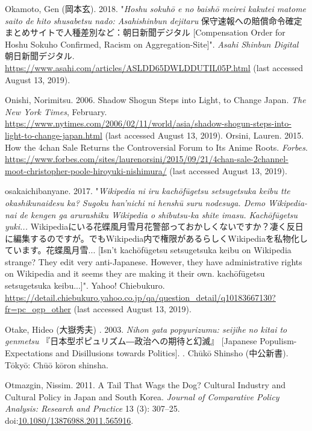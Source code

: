 \documentclass[10pt,british,A4paper,oneside]{memoir}
\begin{document}
\hypertarget{ref-okamoto_eng:_2018}{}
Okamoto, Gen (岡本玄). 2018. "\emph{Hoshu sokuhō e no baishō meirei kakutei matome saito de hito shusabetsu nado: Asahishinbun dejitaru} 保守速報への賠償命令確定 まとめサイトで人種差別など：朝日新聞デジタル [Compensation Order for Hoshu Sokuho Confirmed, Racism on Aggregation-Site]". \emph{Asahi Shinbun Digital} 朝日新聞デジタル.
\url{https://www.asahi.com/articles/ASLDD65DWLDDUTIL05P.html} (last accessed August 13, 2019).

\hypertarget{ref-onishi_shadow_2006}{}
Onishi, Norimitsu. 2006. Shadow Shogun Steps into Light, to Change
Japan. \emph{The New York Times}, February.
\url{https://www.nytimes.com/2006/02/11/world/asia/shadow-shogun-steps-into-light-to-change-japan.html} (last accessed August 13, 2019).
\hypertarget{ref-orsini_how_2015}{}
Orsini, Lauren. 2015. How the 4chan Sale Returns the Controversial Forum
to Its Anime Roots. \emph{Forbes}.
\url{https://www.forbes.com/sites/laurenorsini/2015/09/21/4chan-sale-2channel-moot-christopher-poole-hiroyuki-nishimura/} (last accessed August 13, 2019).

\hypertarget{ref-osakaichibanyane_isnt_2017}{}
osakaichibanyane. 2017. "\emph{Wikipedia ni iru kachōfūgetsu setsugetsuka keibu tte okashikunaidesu ka? Sugoku han'nichi ni henshū suru nodesuga. Demo Wikipedia-nai de kengen ga arurashiku Wikipedia o shibutsu-ka shite imasu. Kachōfūgetsu yuki...} Wikipediaにいる花蝶風月雪月花警部っておかしくないですか？凄く反日に編集するのですが。でもWikipedia内で権限があるらしくWikipediaを私物化しています。花蝶風月雪... [Isn't kachōfūgetsu setsugetsuka keibu on Wikipedia strange? They edit very anti-Japanese. However, they have administrative rights on Wikipedia and it seems they are making it their own. kachōfūgetsu setsugetsuka keibu...]". Yahoo! Chiebukuro. \url{https://detail.chiebukuro.yahoo.co.jp/qa/question_detail/q10183667130?fr=pc_ogp_other} (last accessed August 13, 2019).

\hypertarget{ref-otake__2003}{}
Otake, Hideo (大嶽秀夫) . 2003. \emph{Nihon gata popyurizumu: seijihe no kitai to genmetsu} 『日本型ポピュリズム―政治への期待と幻滅』 [Japanese Populism-Expectations and Disillusions towards Politics].
. Chūkō Shinsho (中公新書). Tōkyō: Chūō kōron shinsha.

\hypertarget{ref-otmazgin_tail_2011}{}
Otmazgin, Nissim. 2011. A Tail That Wags the Dog? Cultural Industry and
Cultural Policy in Japan and South Korea. \emph{Journal of Comparative
Policy Analysis: Research and Practice} 13 (3): 307--25.
doi:\href{https://doi.org/10.1080/13876988.2011.565916}{10.1080/13876988.2011.565916}.
\end{document}
